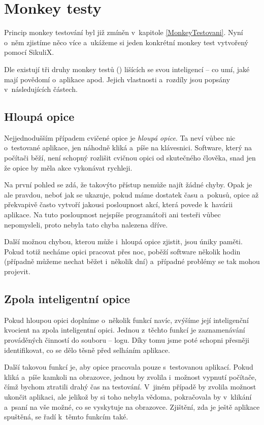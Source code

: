 \chapter{Monkey testy}
Princip monkey testování byl již zmíněn v~kapitole \ref{MonkeyTestovani}. Nyní o~něm zjistíme něco více a~ukážeme si jeden konkrétní monkey test vytvořený pomocí SikuliX.

Dle \citep{Patton} existují tři druhy monkey testů () lišících se svou inteligencí -- co umí, jaké mají povědomí o~aplikace apod. Jejich vlastnosti a~rozdíly jsou popsány v~následujících částech.

	\section{Hloupá opice}
	Nejjednodušším případem cvičené opice je \emph{hloupá opice}. Ta neví vůbec nic o~testované aplikace, jen náhodně kliká a~píše na klávesnici. Software, který na počítači běží, není schopný rozlišit cvičnou opici od skutečného člověka, snad jen že opice by měla akce vykonávat rychleji.
	
	Na první pohled se zdá, že takovýto přístup nemůže najít žádné chyby. Opak je ale pravdou, neboť jak se ukazuje, pokud máme dostatek času a~pokusů, opice až překvapivě často vytvoří jakousi posloupnost akcí, která povede k~havárii aplikace. Na tuto posloupnost nejspíše programátoři ani testeři vůbec nepomysleli, proto nebyla tato chyba nalezena dříve.
	
	Další možnou chybou, kterou může i~hloupá opice zjistit, jsou úniky paměti. Pokud totiž necháme opici pracovat přes noc, poběží software několik hodin (případně můžeme nechat běžet i~několik dní) a~případné problémy se tak mohou projevit.
	
	\section{Zpola inteligentní opice}
	Pokud hloupou opici doplníme o~několik funkcí navíc, zvýšíme její inteligenční kvocient na zpola inteligentní opici. Jednou z~těchto funkcí je zaznamenávání prováděných činností do souboru -- logu. Díky tomu jsme poté schopni přesněji identifikovat, co se dělo těsně před selháním aplikace.
	
	Další takovou funkcí je, aby opice pracovala pouze s~testovanou aplikací. Pokud kliká a~píše kamkoli na obrazovce, jednou by zvolila i~možnost vypnutí počítače, čímž bychom ztratili drahý čas na testování. V~jiném případě by zvolila možnost ukončit aplikaci, ale jelikož by si toho nebyla vědoma, pokračovala by v~klikání a~psaní na vše možné, co se vyskytuje na obrazovce. Zjištění, zda je ještě aplikace spuštěná, se řadí k~těmto funkcím také.
	
